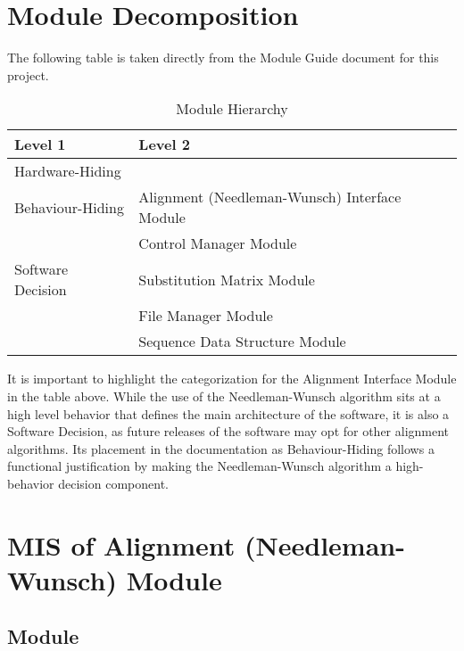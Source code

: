 \documentclass[12pt, titlepage]{article}
\begin{document}
\section{Module Decomposition}

The following table is taken directly from the Module Guide document for this project.

\begin{table}[h!]
    \centering
    \begin{tabular}{p{} p{}}
    \toprule
    \textbf{Level 1} & \textbf{Level 2}\\
    \midrule
    
    Hardware-Hiding & ~ \\
    \midrule
    
    Behaviour-Hiding & Alignment (Needleman-Wunsch) Interface Module\\
    & Control Manager Module\\
    \midrule
    
    Software Decision & Substitution Matrix Module\\
    & File Manager Module\\
    & Sequence Data Structure Module\\
    \bottomrule
    
    \end{tabular}
    \caption{Module Hierarchy}
    \label{TblMH}
\end{table}


\newpage
It is important to highlight the categorization for the Alignment Interface Module in the table above. 
While the use of the Needleman-Wunsch algorithm sits at a high level behavior that defines 
the main architecture of the software, it is also a Software Decision, as future releases of the 
software may opt for other alignment algorithms. Its placement in the documentation as Behaviour-Hiding follows
a functional justification by making the Needleman-Wunsch algorithm a high-behavior decision component.
~\newpage

\section{MIS of Alignment (Needleman-Wunsch) Module} \label{mNW}

\subsection{Module}
\end{document}
